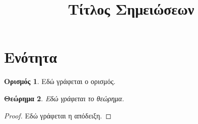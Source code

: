 \documentclass[12pt,a4paper]{article}
\title{Τίτλος Σημειώσεων}
\author{}
\date{}
\theoremstyle{plain}
\newtheorem{theorem}{Θεώρημα}[section]
\theoremstyle{definition}
\newtheorem{definition}[theorem]{Ορισμός}
\theoremstyle{remark}
\begin{document}
\maketitle

\section{Ενότητα}

\begin{definition}
Εδώ γράφεται ο ορισμός.
\end{definition}

\begin{theorem}
Εδώ γράφεται το θεώρημα.
\end{theorem}

\begin{proof}
Εδώ γράφεται η απόδειξη.
\end{proof}
\end{document}
